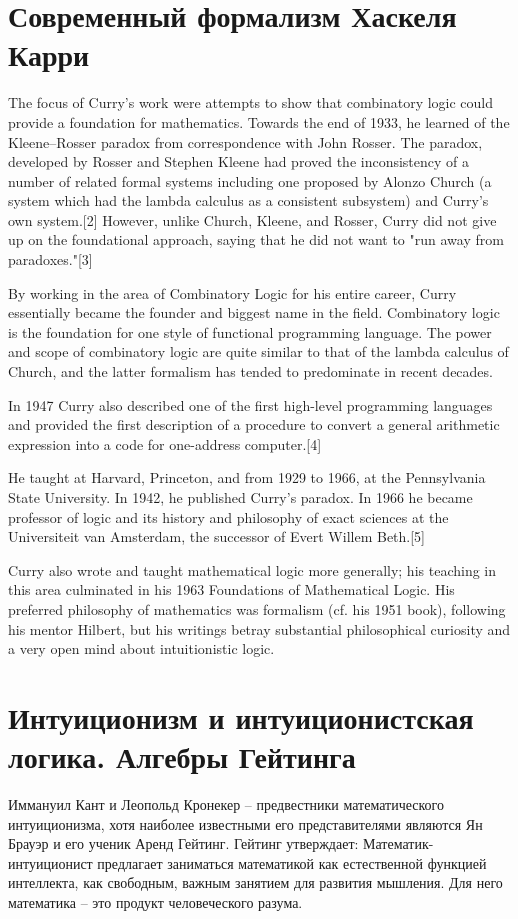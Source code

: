 \documentclass[12pt, specialist, subf, substylefile = spbu.rtx]{disser}
\begin{document}
\section{Современный формализм Хаскеля Карри}
The focus of Curry's work were attempts to show that combinatory logic could provide a foundation for mathematics. Towards the end of 1933, he learned of the Kleene–Rosser paradox from correspondence with John Rosser. The paradox, developed by Rosser and Stephen Kleene had proved the inconsistency of a number of related formal systems including one proposed by Alonzo Church (a system which had the lambda calculus as a consistent subsystem) and Curry's own system.[2] However, unlike Church, Kleene, and Rosser, Curry did not give up on the foundational approach, saying that he did not want to "run away from paradoxes."[3]

By working in the area of Combinatory Logic for his entire career, Curry essentially became the founder and biggest name in the field. Combinatory logic is the foundation for one style of functional programming language. The power and scope of combinatory logic are quite similar to that of the lambda calculus of Church, and the latter formalism has tended to predominate in recent decades.

In 1947 Curry also described one of the first high-level programming languages and provided the first description of a procedure to convert a general arithmetic expression into a code for one-address computer.[4]

He taught at Harvard, Princeton, and from 1929 to 1966, at the Pennsylvania State University. In 1942, he published Curry's paradox. In 1966 he became professor of logic and its history and philosophy of exact sciences at the Universiteit van Amsterdam, the successor of Evert Willem Beth.[5]

Curry also wrote and taught mathematical logic more generally; his teaching in this area culminated in his 1963 Foundations of Mathematical Logic. His preferred philosophy of mathematics was formalism (cf. his 1951 book), following his mentor Hilbert, but his writings betray substantial philosophical curiosity and a very open mind about intuitionistic logic.

\section{Интуиционизм и интуиционистская логика. Алгебры Гейтинга}
Иммануил Кант и Леопольд Кронекер – предвестники математического интуиционизма, хотя наиболее известными его представителями являются Ян Брауэр и его ученик Аренд Гейтинг. Гейтинг утверждает:
Математик-интуиционист предлагает заниматься математикой как естественной функцией интеллекта, как свободным, важным занятием для развития мышления. Для него математика – это продукт человеческого разума.
\end{document}
